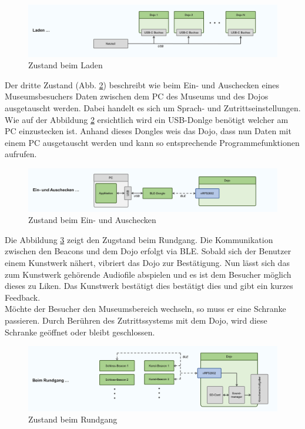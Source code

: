 \documentclass[10pt,a4paper,oneside]{99_fhnwreport}
\begin{document}
\begin{figure}[htb]
\includegraphics[width=\textwidth]{Zustand_Laden.png}
\caption{Zustand beim Laden} %
\label{fig:image2}
\end{figure}

Der dritte Zustand (Abb. \ref{fig:image1}) beschreibt wie beim Ein- und Auschecken eines Museumsbesuchers Daten zwischen dem PC des Museums und des Dojos ausgetauscht werden. Dabei handelt es sich um Sprach- und Zutrittseinstellungen. Wie auf der Abbildung \ref{fig:image1} ersichtlich wird ein USB-Donlge benötigt welcher am PC einzustecken ist. Anhand dieses Dongles weis das Dojo, dass nun Daten mit einem PC ausgetauscht werden und kann so entsprechende Programmefunktionen aufrufen.

\begin{figure}[htb]
\includegraphics[width=\textwidth]{Zustand_Ein_Aus_Checken.png}
\caption{Zustand beim Ein- und Auschecken} %
\label{fig:image1}
\end{figure}

Die Abbildung \ref{fig:image4} zeigt den Zugstand beim Rundgang. Die Kommunikation zwischen den Beacons und dem Dojo erfolgt via BLE. Sobald sich der Benutzer einem Kunstwerk nähert, vibriert das Dojo zur Bestätigung. Nun lässt sich das zum Kunstwerk gehörende Audiofile abspielen und es ist dem Besucher möglich dieses zu Liken. Das Kunstwerk bestätigt dies bestätigt dies und gibt ein kurzes Feedback. \\
Möchte der Besucher den Museumsbereich wechseln, so muss er eine Schranke passieren. Durch Berühren des Zutrittssystems mit dem Dojo, wird diese Schranke geöffnet oder bleibt geschlossen.

\begin{figure}[htb]
\includegraphics[width=\textwidth]{Zustand_Rundgang.png}
\caption{Zustand beim Rundgang} %
\label{fig:image4}
\end{figure}
\end{document}
